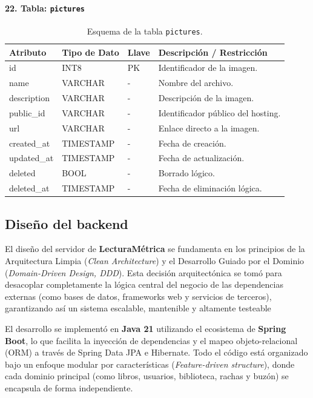\documentclass[12pt, atypical, journal]{article}
\begin{document}
\paragraph{22. Tabla: \texttt{pictures}}
\begin{table}[H]
	\centering
	\begin{tabular}{|l|l|l|p{6.5cm}|}
		\hline
		\textbf{Atributo} & \textbf{Tipo de Dato} & \textbf{Llave} & \textbf{Descripción / Restricción} \\ \hline
		id & INT8 & PK & Identificador de la imagen. \\ \hline
		name & VARCHAR & - & Nombre del archivo. \\ \hline
		description & VARCHAR & - & Descripción de la imagen. \\ \hline
		public\_id & VARCHAR & - & Identificador público del hosting. \\ \hline
		url & VARCHAR & - & Enlace directo a la imagen. \\ \hline
		created\_at & TIMESTAMP & - & Fecha de creación. \\ \hline
		updated\_at & TIMESTAMP & - & Fecha de actualización. \\ \hline
		deleted & BOOL & - & Borrado lógico. \\ \hline
		deleted\_at & TIMESTAMP & - & Fecha de eliminación lógica. \\ \hline
	\end{tabular}
	\caption{Esquema de la tabla \texttt{pictures}.}
\end{table}
\subsection{Diseño del backend}

El diseño del servidor de \textbf{LecturaMétrica} se fundamenta en los principios de la Arquitectura Limpia (\textit{Clean Architecture}) y el Desarrollo Guiado por el Dominio (\textit{Domain-Driven Design, DDD}). Esta decisión arquitectónica se tomó para desacoplar completamente la lógica central del negocio de las dependencias externas (como bases de datos, frameworks web y servicios de terceros), garantizando así un sistema escalable, mantenible y altamente testeable

El desarrollo se implementó en \textbf{Java 21} utilizando el ecosistema de \textbf{Spring Boot}, lo que facilita la inyección de dependencias y el mapeo objeto-relacional (ORM) a través de Spring Data JPA e Hibernate. 
Todo el código está organizado bajo un enfoque modular por características (\textit{Feature-driven structure}), donde cada dominio principal (como libros, usuarios, biblioteca, rachas y buzón) se encapsula de forma independiente.
\end{document}
